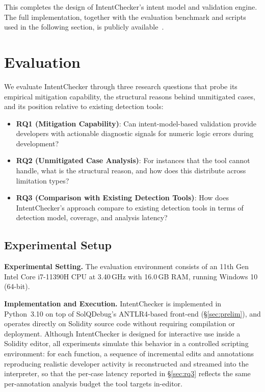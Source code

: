 \documentclass[pdflatex,sn-basic]{sn-jnl}%
\theoremstyle{thmstyleone}%
\theoremstyle{thmstyletwo}%
\theoremstyle{thmstylethree}%
\begin{document}
This completes the design of IntentChecker's intent model and validation engine. The full implementation, together with the evaluation benchmark and scripts used in the following section, is publicly available~\citep{intentchecker}.

\section{Evaluation}\label{sec:evaluation}

We evaluate IntentChecker through three research questions that probe its empirical mitigation capability, the structural reasons behind unmitigated cases, and its position relative to existing detection tools:

\begin{itemize}
    \item \textbf{RQ1 (Mitigation Capability)}: Can intent-model-based validation provide developers with actionable diagnostic signals for numeric logic errors during development?
    \item \textbf{RQ2 (Unmitigated Case Analysis)}: For instances that the tool cannot handle, what is the structural reason, and how does this distribute across limitation types?
    \item \textbf{RQ3 (Comparison with Existing Detection Tools)}: How does IntentChecker's approach compare to existing detection tools in terms of detection model, coverage, and analysis latency?
\end{itemize}

\subsection{Experimental Setup}\label{sec:setup}

\noindent\textbf{Experimental Setting.}
The evaluation environment consists of an 11th Gen Intel\textregistered{} Core\texttrademark{}
i7-11390H CPU at 3.40\,GHz with 16.0\,GB RAM, running Windows 10 (64-bit).

\smallskip
\noindent\textbf{Implementation and Execution.}
IntentChecker is implemented in Python~3.10 on top of SolQDebug's ANTLR4-based front-end (\S\ref{sec:prelim}), and operates directly on Solidity source code without requiring compilation or deployment.
Although IntentChecker is designed for interactive use inside a Solidity editor, all experiments simulate this behavior in a controlled scripting environment: for each function, a sequence of incremental edits and annotations reproducing realistic developer activity is reconstructed and streamed into the interpreter, so that the per-case latency reported in \S\ref{sec:rq3} reflects the same per-annotation analysis budget the tool targets in-editor.
\end{document}
